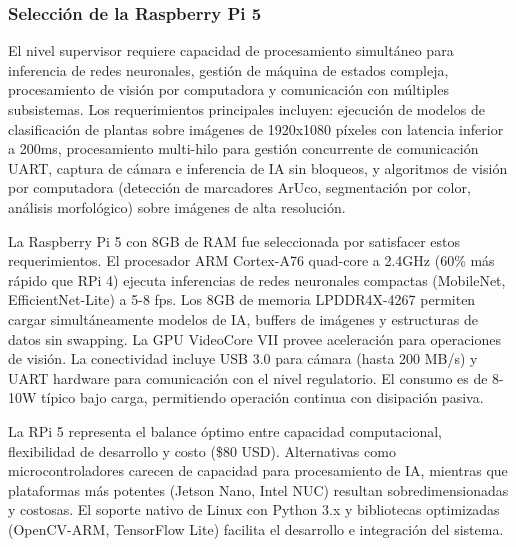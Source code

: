 \subsubsection{Selección de la Raspberry Pi 5}

El nivel supervisor requiere capacidad de procesamiento simultáneo para inferencia de redes neuronales, gestión de máquina de estados compleja, procesamiento de visión por computadora y comunicación con múltiples subsistemas. Los requerimientos principales incluyen: ejecución de modelos de clasificación de plantas sobre imágenes de 1920x1080 píxeles con latencia inferior a 200ms, procesamiento multi-hilo para gestión concurrente de comunicación UART, captura de cámara e inferencia de IA sin bloqueos, y algoritmos de visión por computadora (detección de marcadores ArUco, segmentación por color, análisis morfológico) sobre imágenes de alta resolución.

La Raspberry Pi 5 con 8GB de RAM fue seleccionada por satisfacer estos requerimientos. El procesador ARM Cortex-A76 quad-core a 2.4GHz (60\% más rápido que RPi 4) ejecuta inferencias de redes neuronales compactas (MobileNet, EfficientNet-Lite) a 5-8 fps. Los 8GB de memoria LPDDR4X-4267 permiten cargar simultáneamente modelos de IA, buffers de imágenes y estructuras de datos sin swapping. La GPU VideoCore VII provee aceleración para operaciones de visión. La conectividad incluye USB 3.0 para cámara (hasta 200 MB/s) y UART hardware para comunicación con el nivel regulatorio. El consumo es de 8-10W típico bajo carga, permitiendo operación continua con disipación pasiva.

La RPi 5 representa el balance óptimo entre capacidad computacional, flexibilidad de desarrollo y costo (\$80 USD). Alternativas como microcontroladores carecen de capacidad para procesamiento de IA, mientras que plataformas más potentes (Jetson Nano, Intel NUC) resultan sobredimensionadas y costosas. El soporte nativo de Linux con Python 3.x y bibliotecas optimizadas (OpenCV-ARM, TensorFlow Lite) facilita el desarrollo e integración del sistema.
